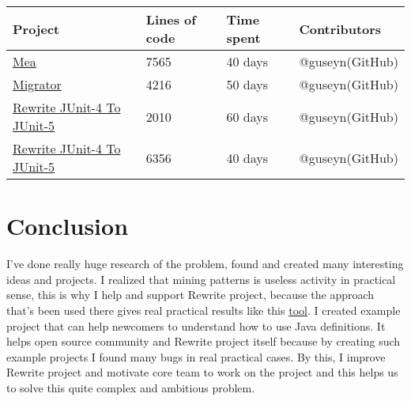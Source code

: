 \documentclass[sigplan,screen,11pt]{acmart}
\begin{document}
\begin{center}
\begin{tabular}{ | m{5em} | m{5em}| m{5em} | m{10em} | } 
\hline
Project & Lines of code & Time spent & Contributors \\ 
\hline
\href{https://github.com/guseyn/mea}{Mea} & 7565 & 40 days & @guseyn(GitHub) \\
\hline
\href{https://github.com/Guseyn/Migrator}{Migrator} & 4216 & 50 days & @guseyn(GitHub) \\
\hline
\href{https://github.com/guseyn/rewrite-junit4-to-junit5}{Rewrite JUnit-4 To JUnit-5} & 2010 & 60 days & @guseyn(GitHub) \\
\hline
\href{https://github.com/guseyn/rewrite-junit4-to-junit5}{Rewrite JUnit-4 To JUnit-5} & 6356 & 40 days & @guseyn(GitHub) \\
\hline

\end{tabular}
\end{center}

\section{Conclusion}

I've done really huge research of the problem, found and created many interesting ideas and projects. I realized that mining patterns is useless activity in practical sense, this is why I help and support Rewrite project, because the approach that's been used there gives real practical results like this \href{https://github.com/openrewrite/rewrite-testing-frameworks/tree/master/src}{tool}. I created example project that can help newcomers to understand how to use Java definitions. It helps open source community and Rewrite project itself because by creating such example projects I found many bugs in real practical cases. By this, I improve Rewrite project and motivate core team to work on the project and this helps us to solve this quite complex and ambitious problem.
\end{document}
